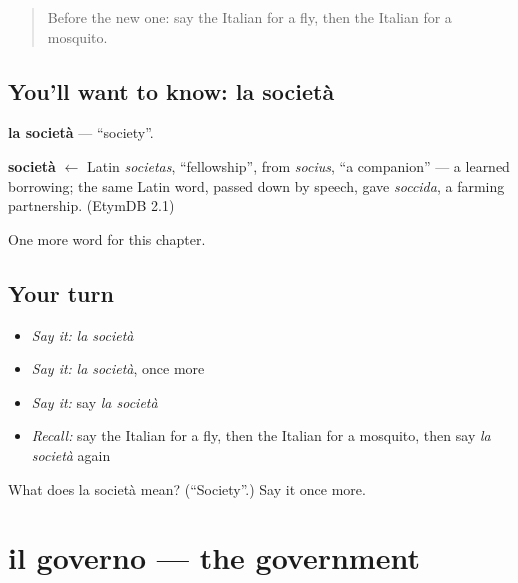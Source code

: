 \label{lesson:IT-C248-societa}



\begin{quote}
Before the new one: say the Italian for a fly, then the Italian for a mosquito.
\end{quote}

\subsection*{You'll want to know: la società}
\textbf{la società} — \textquotedblleft{}society\textquotedblright{}.

\begin{cousinweb}
\textbf{società} $\leftarrow$ Latin \emph{societas}, \textquotedblleft{}fellowship\textquotedblright{}, from \emph{socius}, \textquotedblleft{}a companion\textquotedblright{} — a learned borrowing; the same Latin word, passed down by speech, gave \emph{soccida}, a farming partnership. (EtymDB 2.1)
\end{cousinweb}

\begin{grammarlens}[title={What you've built}]
One more word for this chapter.
\end{grammarlens}

\subsection*{Your turn}
\begin{itemize}
\raggedright
  \item \emph{Say it:} \emph{la società}
  \item \emph{Say it:} \emph{la società}, once more
  \item \emph{Say it:} say \emph{la società}
  \item \emph{Recall:} say the Italian for a fly, then the Italian for a mosquito, then say \emph{la società} again
\end{itemize}

\begin{tcolorbox}[breakable,colback=teal!4,colframe=teal!35!black,title={Before you move on}]
What does la società mean? (\textquotedblleft{}Society\textquotedblright{}.) Say it once more.
\end{tcolorbox}
\section[il governo]{il governo — the government}

